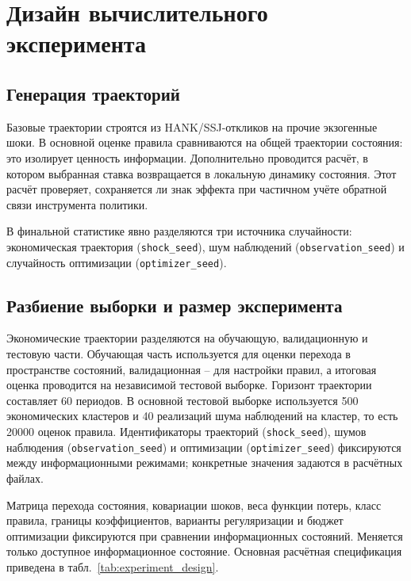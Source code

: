 \section{Дизайн вычислительного эксперимента}

\subsection{Генерация траекторий}

Базовые траектории строятся из HANK/SSJ-откликов на прочие экзогенные шоки. В основной оценке
правила сравниваются на общей траектории состояния: это изолирует ценность информации.
Дополнительно проводится расчёт, в котором выбранная ставка возвращается в локальную динамику
состояния. Этот расчёт проверяет, сохраняется ли знак эффекта при частичном учёте обратной связи
инструмента политики.

В финальной статистике явно разделяются три источника случайности: экономическая траектория
(\texttt{shock\_seed}), шум наблюдений (\texttt{observation\_seed}) и случайность оптимизации
(\texttt{optimizer\_seed}).

\subsection{Разбиение выборки и размер эксперимента}

Экономические траектории разделяются на обучающую, валидационную и тестовую части. Обучающая
часть используется для оценки перехода в пространстве состояний, валидационная -- для настройки
правил, а итоговая оценка проводится на независимой тестовой выборке. Горизонт траектории
составляет 60 периодов. В основной тестовой выборке используется 500 экономических кластеров и 40
реализаций шума наблюдений на кластер, то есть 20000 оценок правила. Идентификаторы траекторий
(\texttt{shock\_seed}), шумов наблюдения (\texttt{observation\_seed}) и оптимизации
(\texttt{optimizer\_seed}) фиксируются между информационными режимами; конкретные значения
задаются в расчётных файлах.

Матрица перехода состояния, ковариации шоков, веса функции потерь, класс правила, границы
коэффициентов, варианты регуляризации и бюджет оптимизации фиксируются при сравнении
информационных состояний. Меняется только доступное информационное состояние.
Основная расчётная спецификация приведена в табл.~\ref{tab:experiment_design}.

